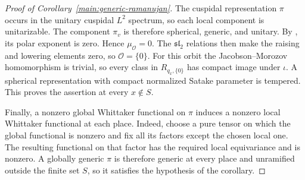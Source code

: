 \begin{proof}[Proof of Corollary~\ref{main:generic-ramanujan}]
The cuspidal representation $\pi$ occurs in the unitary cuspidal
$L^2$ spectrum, so each local component is unitarizable. The component
$\pi_v$ is therefore spherical, generic, and unitary. By
\cite[Corollary~6.32\textup{(1)}]{CiubotaruHarris}, its polar exponent
is zero. Hence $\mu_{\mathcal O}=0$. The $\mathfrak{sl}_2$ relations
then make the raising and lowering elements zero, so
$\mathcal O=\{0\}$. For this orbit the Jacobson--Morozov homomorphism is
trivial, so every class in $R_{q_x,\{0\}}$ has compact image under
$\iota$. A spherical representation with compact normalized Satake
parameter is tempered. This proves the assertion at every $x\notin S$.

Finally, a nonzero global Whittaker functional on $\pi$ induces a
nonzero local Whittaker functional at each place. Indeed, choose a pure
tensor on which the global functional is nonzero and fix all its factors
except the chosen local one. The resulting functional on that factor
has the required local equivariance and is nonzero. A globally generic
$\pi$ is therefore generic at every place and unramified outside the
finite set $S$, so it satisfies the hypothesis of the corollary.
\end{proof}
